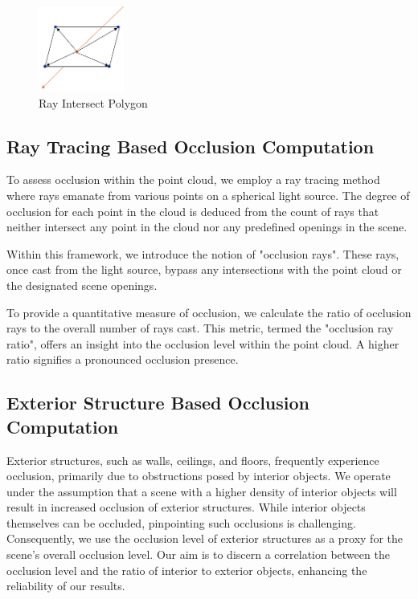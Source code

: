 \documentclass[11pt, a4paper,oneside,chapterprefix=false]{scrbook}
\begin{document}
\begin{minipage}{\textwidth}
	\begin{figure}[H]
		\centering
		\includegraphics*[width=0.25\textwidth]{figures/intersect polygon.png}
		\caption{Ray Intersect Polygon}
		\label{fig:ray intersect polygon}
	\end{figure}
\end{minipage}


\subsection{Ray Tracing Based Occlusion Computation} \label{sec:ray tracing occlusion computation}

To assess occlusion within the point cloud, we employ a ray tracing method where rays emanate from various points on a spherical light source. The degree of occlusion for each point in the cloud is deduced from the count of rays that neither intersect any point in the cloud nor any predefined openings in the scene.

\vspace{10pt}

Within this framework, we introduce the notion of "occlusion rays". These rays, once cast from the light source, bypass any intersections with the point cloud or the designated scene openings.

\vspace{10pt}

To provide a quantitative measure of occlusion, we calculate the ratio of occlusion rays to the overall number of rays cast. This metric, termed the "occlusion ray ratio", offers an insight into the occlusion level within the point cloud. A higher ratio signifies a pronounced occlusion presence.

\subsection{Exterior Structure Based Occlusion Computation} \label{sec:exterior structure occlusion computation}

Exterior structures, such as walls, ceilings, and floors, frequently experience occlusion, primarily due to obstructions posed by interior objects. We operate under the assumption that a scene with a higher density of interior objects will result in increased occlusion of exterior structures. While interior objects themselves can be occluded, pinpointing such occlusions is challenging. Consequently, we use the occlusion level of exterior structures as a proxy for the scene's overall occlusion level. Our aim is to discern a correlation between the occlusion level and the ratio of interior to exterior objects, enhancing the reliability of our results.
\end{document}

